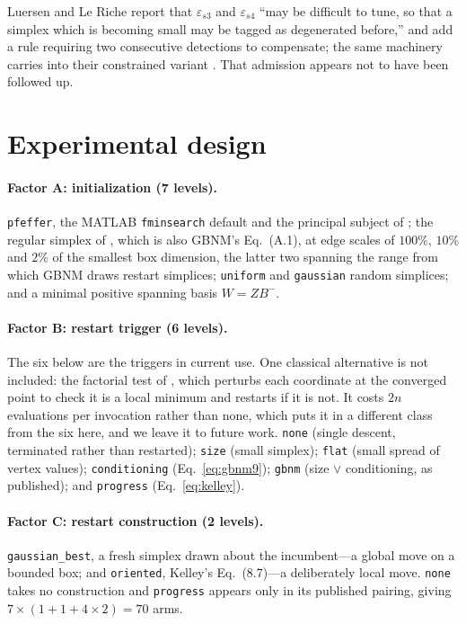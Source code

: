\documentclass[11pt,a4paper]{article}
\begin{document}
Luersen and Le Riche report that $\varepsilon_{s3}$ and $\varepsilon_{s4}$ ``may
be difficult to tune, so that a simplex which is becoming small may be tagged as
degenerated before,'' and add a rule requiring two consecutive detections to
compensate; the same machinery carries into their constrained variant
\citep{luersen2004smo}. That admission appears not to have been followed up.

\section{Experimental design}
\label{sec:design}

\paragraph{Factor A: initialization (7 levels).}
\texttt{pfeffer}, the MATLAB \texttt{fminsearch} default and the principal
subject of \citet{wessing2019}; the regular simplex of \citet{spendley1962},
which is also GBNM's Eq.~(A.1), at edge scales of $100\%$, $10\%$ and $2\%$ of
the smallest box dimension, the latter two spanning the range from which GBNM
draws restart simplices; \texttt{uniform} and \texttt{gaussian} random
simplices; and a minimal positive spanning basis $W=ZB^{-}$.

\paragraph{Factor B: restart trigger (6 levels).}
The six below are the triggers in current use. One classical alternative is not
included: the factorial test of \citet{oneill1971}, which perturbs each
coordinate at the converged point to check it is a local minimum and restarts if
it is not. It costs $2n$ evaluations per invocation rather than none, which puts
it in a different class from the six here, and we leave it to future work.
\texttt{none} (single descent, terminated rather than restarted); \texttt{size}
(small simplex); \texttt{flat} (small spread of vertex values);
\texttt{conditioning} (Eq.~\eqref{eq:gbnm9}); \texttt{gbnm} (size $\lor$
conditioning, as published); and \texttt{progress} (Eq.~\eqref{eq:kelley}).

\paragraph{Factor C: restart construction (2 levels).}
\texttt{gaussian\_best}, a fresh simplex drawn about the incumbent---a global
move on a bounded box; and \texttt{oriented}, Kelley's Eq.~(8.7)---a deliberately
local move. \texttt{none} takes no construction and \texttt{progress} appears
only in its published pairing, giving $7\times(1+1+4\times2)=70$ arms.
\end{document}
